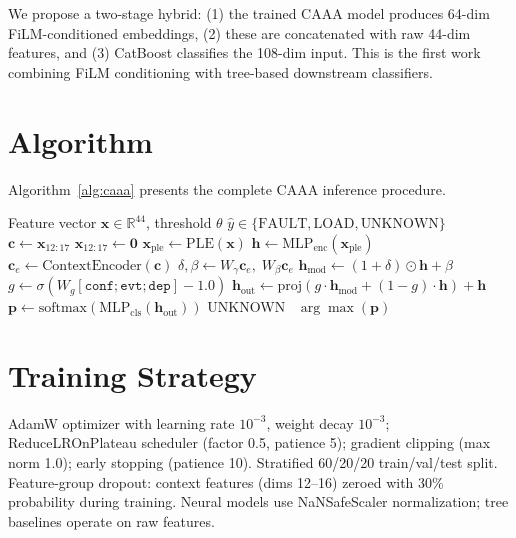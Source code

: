 \documentclass[12pt,a4paper]{report}
\newcommand{\sys}{CAAA}
\begin{document}
We propose a two-stage hybrid: (1) the trained CAAA model produces 64-dim FiLM-conditioned embeddings, (2) these are concatenated with raw 44-dim features, and (3) CatBoost classifies the 108-dim input. This is the first work combining FiLM conditioning with tree-based downstream classifiers.

\section{Algorithm}

Algorithm~\ref{alg:caaa} presents the complete \sys{} inference procedure.

\begin{algorithm}[h]
\caption{\sys{}: Context-Aware Anomaly Attribution}
\label{alg:caaa}
\begin{algorithmic}[1]
\Require Feature vector $\mathbf{x} \in \mathbb{R}^{44}$, threshold $\theta$
\Ensure $\hat{y} \in \{\text{FAULT}, \text{LOAD}, \text{UNKNOWN}\}$
\State $\mathbf{c} \leftarrow \mathbf{x}_{12:17}$ 
    \State $\mathbf{x}_{12:17} \leftarrow \mathbf{0}$ 
\EndIf
\State $\mathbf{x}_{\text{ple}} \leftarrow \text{PLE}(\mathbf{x})$ 
\State $\mathbf{h} \leftarrow \text{MLP}_{\text{enc}}(\mathbf{x}_{\text{ple}})$ 
\State $\mathbf{c}_e \leftarrow \text{ContextEncoder}(\mathbf{c})$
\State $\delta, \beta \leftarrow W_\gamma \mathbf{c}_e,\; W_\beta \mathbf{c}_e$ 
\State $\mathbf{h}_{\text{mod}} \leftarrow (1{+}\delta) \odot \mathbf{h} + \beta$ 
\State $g \leftarrow \sigma(W_g[\texttt{conf};\texttt{evt};\texttt{dep}] - 1.0)$ 
\State $\mathbf{h}_{\text{out}} \leftarrow \text{proj}(g \cdot \mathbf{h}_{\text{mod}} + (1{-}g) \cdot \mathbf{h}) + \mathbf{h}$
\State $\mathbf{p} \leftarrow \text{softmax}(\text{MLP}_{\text{cls}}(\mathbf{h}_{\text{out}}))$
 \Return UNKNOWN
\Else\ \Return $\arg\max(\mathbf{p})$
\EndIf
\end{algorithmic}
\end{algorithm}

\section{Training Strategy}

AdamW optimizer with learning rate $10^{-3}$, weight decay $10^{-3}$; ReduceLROnPlateau scheduler (factor 0.5, patience 5); gradient clipping (max norm 1.0); early stopping (patience 10). Stratified 60/20/20 train/val/test split. Feature-group dropout: context features (dims 12--16) zeroed with 30\% probability during training. Neural models use NaNSafeScaler normalization; tree baselines operate on raw features.
\end{document}
